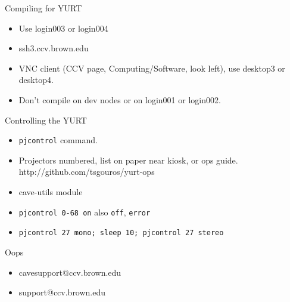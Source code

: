 \documentclass[12pt]{article}
\begin{document}
\begin{frame}{Compiling for YURT}

\begin{center}
\begin{minipage}{0.9\columnwidth}
\begin{itemize}

\item Use login003 or login004

\item ssh3.ccv.brown.edu

\item VNC client (CCV page, Computing/Software, look left), use
  desktop3 or desktop4.


\item Don't compile on dev nodes or on login001 or login002.

\end{itemize}
\end{minipage}
\end{center}
\end{frame}




\begin{frame}{Controlling the YURT}

\begin{center}
\begin{minipage}{0.9\columnwidth}
\begin{itemize}

\item \texttt{pjcontrol} command.

\item Projectors numbered, list on paper near kiosk, or ops guide.
   http://github.com/tsgouros/yurt-ops

\item cave-utils module

\item \texttt{pjcontrol 0-68 on} also \texttt{off}, \texttt{error}

\item \texttt{pjcontrol 27 mono; sleep 10; pjcontrol 27 stereo}

\end{itemize}
\end{minipage}
\end{center}
\end{frame}

\begin{frame}{Oops}

\begin{center}
\begin{minipage}{0.9\columnwidth}
\begin{itemize}

\item cavesupport@ccv.brown.edu

\item support@ccv.brown.edu

\end{itemize}
\end{minipage}
\end{center}
\end{frame}
\end{document}

